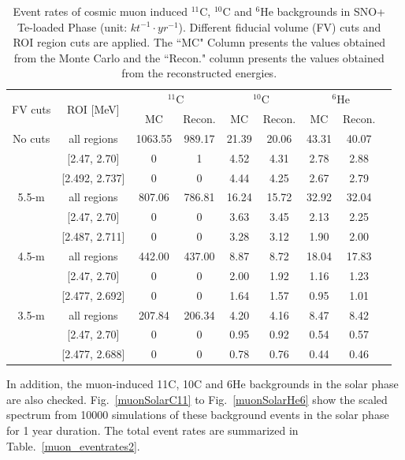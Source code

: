 \begin{table}[ht]
	\caption{Event rates of cosmic muon induced $^{11}$C, $^{10}$C and $^{6}$He backgrounds in SNO+ Te-loaded Phase (unit: $kt^{-1}\cdot yr^{-1}$). 
		Different fiducial volume (FV) cuts and ROI region cuts are applied. The ``MC" Column presents the values obtained from the Monte Carlo and the ``Recon." column presents the values obtained from the reconstructed energies.}
	\centering
	\begin{tabular*}{150mm}{c@{\extracolsep{\fill}}cccccccc}
		\toprule
		\multirow{2}{*}{FV cuts} & \multirow{2}{*}{ROI [MeV]} & \multicolumn{2}{c}{$^{11}$C} & \multicolumn{2}{c}{$^{10}$C} & \multicolumn{2}{c}{$^{6}$He}\\
		\cline{3-4}  \cline{5-6} \cline{7-8}
		&  & MC&Recon. &MC&Recon.& MC&Recon.\\
		\midrule
		No cuts & all regions& 1063.55& 989.17 &21.39 &20.06& 43.31& 40.07\\	
		&[2.47, 2.70] &0 &1& 4.52& 4.31 &2.78& 2.88\\
		&[2.492, 2.737] &0& 0& 4.44& 4.25& 2.67& 2.79\\
		5.5-m & all regions & 807.06& 786.81& 16.24& 15.72& 32.92& 32.04\\
		&[2.47, 2.70] &0 &0 &3.63 &3.45 &2.13 &2.25\\
		&[2.487, 2.711] &0 &0 &3.28 &3.12 &1.90 &2.00\\
		4.5-m & all regions & 442.00 &437.00 &8.87 &8.72 &18.04 &17.83\\
		&[2.47, 2.70]& 0 &0& 2.00& 1.92& 1.16& 1.23\\
		&[2.477, 2.692]& 0& 0& 1.64 &1.57& 0.95& 1.01\\
		3.5-m & all regions & 207.84& 206.34& 4.20& 4.16& 8.47& 8.42\\
		&[2.47, 2.70]& 0& 0& 0.95& 0.92& 0.54& 0.57\\
		&[2.477, 2.688]& 0& 0& 0.78& 0.76& 0.44& 0.46\\
		\bottomrule		
	\end{tabular*}\label{muon_eventrates}
\end{table}

In addition, the muon-induced 11C, 10C and 6He backgrounds in the solar phase are also checked. Fig.~\ref{muonSolarC11} to Fig.~\ref{muonSolarHe6}
show the scaled spectrum from 10000 simulations of these background events in the solar phase
for 1 year duration. The total event rates are summarized in Table.~\ref{muon_eventrates2}.

